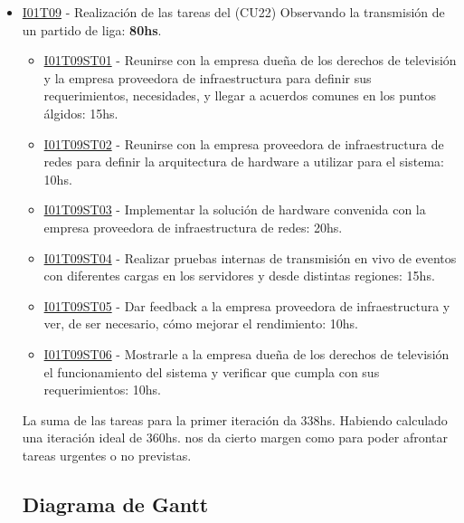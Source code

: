 \begin{itemize}
\item \underline{I01T09} - Realización de las tareas del (CU22) Observando la transmisión de un partido de liga: \textbf{80hs}.
  \begin{itemize}
    \item \underline{I01T09ST01} - Reunirse con la empresa dueña de los derechos de televisión y la empresa proveedora de infraestructura para definir sus requerimientos, necesidades, y llegar a acuerdos comunes en los puntos álgidos: 15hs.
    \item \underline{I01T09ST02} - Reunirse con la empresa proveedora de infraestructura de redes para definir la arquitectura de hardware a utilizar para el sistema: 10hs.
    \item \underline{I01T09ST03} - Implementar la solución de hardware convenida con la empresa proveedora de infraestructura de redes: 20hs.
    \item \underline{I01T09ST04} - Realizar pruebas internas de transmisión en vivo de eventos con diferentes cargas en los servidores y desde distintas regiones: 15hs.
    \item \underline{I01T09ST05} - Dar feedback a la empresa proveedora de infraestructura y ver, de ser necesario, cómo mejorar el rendimiento: 10hs.
    \item \underline{I01T09ST06} - Mostrarle a la empresa dueña de los derechos de televisión el funcionamiento del sistema y verificar que cumpla con sus requerimientos: 10hs.
  \end{itemize}
\hfill

La suma de las tareas para la primer iteración da 338hs. Habiendo calculado una iteración ideal de 360hs. nos da cierto margen como para poder afrontar tareas urgentes o no previstas.

\subsection{Diagrama de Gantt}
  
\end{itemize}
